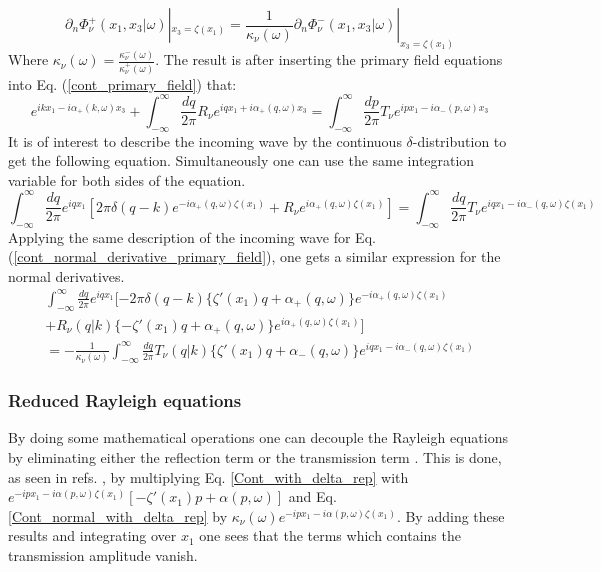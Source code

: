 \documentclass[../main.tex]{subfiles}
\begin{document}
\begin{equation}
    \partial_n\Phi_{\nu}^+\left(x_1, x_3|\omega \right) |_{x_3=\zeta(x_1)} = \frac{1}{\kappa_{\nu}(\omega)}\partial_n\Phi_{\nu}^-\left(x_1, x_3|\omega \right) |_{x_3=\zeta(x_1)}
\label{cont_normal_derivative_primary_field}
\end{equation}
Where $\kappa_{\nu}(\omega) = \frac{\kappa_{\nu}^-(\omega)}{\kappa_{\nu}^+(\omega)}$. The result is after inserting the primary field equations into Eq. (\ref{cont_primary_field}) that:
\begin{equation}
    e^{ikx_1 - i \alpha_+(k,\omega)x_3} + \int_{-\infty}^{\infty}\frac{dq}{2\pi} R_{\nu} e^{iqx_1+i\alpha_+(q,\omega)x_3} = \int_{-\infty}^{\infty}\frac{dp}{2\pi} T_{\nu} e^{ipx_1-i\alpha_-(p,\omega)x_3}
\end{equation}
It is of interest to describe the incoming wave by the continuous $\delta$-distribution to get the following equation. Simultaneously one can use the same integration variable for both sides of the equation.
\begin{equation}
    \int_{-\infty}^{\infty}\frac{dq}{2\pi} e^{iqx_1}[2\pi\delta(q-k)e^{-i\alpha_+(q, \omega)\zeta(x_1)} + R_{\nu} e^{i\alpha_+(q,\omega)\zeta(x_1)}] = \int_{-\infty}^{\infty}\frac{dq}{2\pi} T_{\nu} e^{i q x_1-i\alpha_-(q,\omega)\zeta(x_1)}
\label{Cont_with_delta_rep}
\end{equation}
Applying the same description of the incoming wave for Eq. (\ref{cont_normal_derivative_primary_field}), one gets a similar expression for the normal derivatives.
\begin{equation}
\label{Cont_normal_with_delta_rep}
\begin{split}
    \int_{-\infty}^{\infty}\frac{dq}{2\pi} e^{iqx_1}[-2\pi\delta(q-k)\{ \zeta'(x_1)q + \alpha_+(q, \omega) \}e^{-i\alpha_+(q, \omega)\zeta(x_1)} \\
    + R_{\nu}(q|k)\{-\zeta'(x_1)q+\alpha_+(q, \omega) \} e^{i\alpha_+(q,\omega)\zeta(x_1)}] \\
    = -\frac{1}{\kappa_{\nu}(\omega)}\int_{-\infty}^{\infty}\frac{dq}{2\pi} T_{\nu}(q|k)\{\zeta'(x_1)q+\alpha_-(q, \omega) \} e^{i q x_1-i\alpha_-(q,\omega)\zeta(x_1)}
\end{split}
\end{equation}

\subsubsection{Reduced Rayleigh equations}
By doing some mathematical operations one can decouple the Rayleigh equations by eliminating either the reflection term or the transmission term \cite{BROWN1984}. This is done, as seen in refs. \cite{Maradudinredray,FREILIKHER1997}, by multiplying Eq. \ref{Cont_with_delta_rep} with $e^{-ipx_1 - i\alpha(p,\omega)\zeta(x_1)}[-\zeta'(x_1)p + \alpha(p,\omega)]$ and Eq. \ref{Cont_normal_with_delta_rep} by $\kappa_\nu(\omega)e^{-ipx_1-i\alpha(p,\omega)\zeta(x_1)}$. By adding these results and integrating over $x_1$ one sees that the terms which contains the transmission amplitude vanish. 
\end{document}

